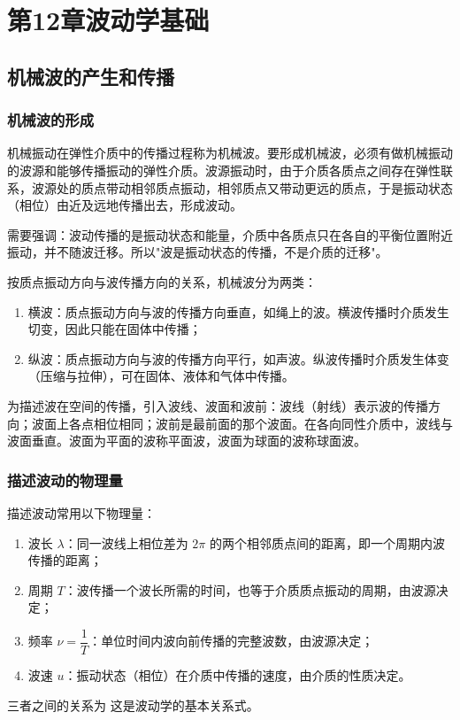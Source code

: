 \chapter{第12章\texorpdfstring{\hspace{0.5em}}{ }波动学基础}

\section{机械波的产生和传播}
    \subsection{机械波的形成}
    机械振动在弹性介质中的传播过程称为机械波。要形成机械波，必须有做机械振动的波源和能够传播振动的弹性介质。波源振动时，由于介质各质点之间存在弹性联系，波源处的质点带动相邻质点振动，相邻质点又带动更远的质点，于是振动状态（相位）由近及远地传播出去，形成波动。

    需要强调：波动传播的是振动状态和能量，介质中各质点只在各自的平衡位置附近振动，并不随波迁移。所以"波是振动状态的传播，不是介质的迁移"。

    按质点振动方向与波传播方向的关系，机械波分为两类：
    \begin{enumerate}
        \item 横波：质点振动方向与波的传播方向垂直，如绳上的波。横波传播时介质发生切变，因此只能在固体中传播；
        \item 纵波：质点振动方向与波的传播方向平行，如声波。纵波传播时介质发生体变（压缩与拉伸），可在固体、液体和气体中传播。
    \end{enumerate}
    为描述波在空间的传播，引入波线、波面和波前：波线（射线）表示波的传播方向；波面上各点相位相同；波前是最前面的那个波面。在各向同性介质中，波线与波面垂直。波面为平面的波称平面波，波面为球面的波称球面波。

    \subsection{描述波动的物理量}
    描述波动常用以下物理量：
    \begin{enumerate}
        \item 波长 $\lambda$：同一波线上相位差为 $2\pi$ 的两个相邻质点间的距离，即一个周期内波传播的距离；
        \item 周期 $T$：波传播一个波长所需的时间，也等于介质质点振动的周期，由波源决定；
        \item 频率 $\nu=\dfrac{1}{T}$：单位时间内波向前传播的完整波数，由波源决定；
        \item 波速 $u$：振动状态（相位）在介质中传播的速度，由介质的性质决定。
    \end{enumerate}
    三者之间的关系为
    这是波动学的基本关系式。

